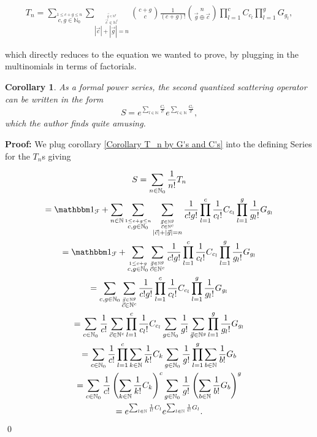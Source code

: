 \documentclass[b5paper,draft,openbib,12pt]{memoir}
\newtheorem{Corollary}[Def]{Corollary}
\newcommand{\id}{{\mathbbm 1}}
\begin{document}
\begin{multline}
T_n = \sum_{\stackrel{1\le c+g\le n}{c,g\in\mathbb{N}_0}}
\sum_{\stackrel{\stackrel{\vec{g}\in\mathbb{N}^g}{\vec{c}\in\mathbb{N}^c}}{|\vec{c}| + |\vec{g}|=n}} 
\binom{c+g}{c} \frac{1}{(c+g)!} \binom{n}{\vec{g}\oplus \vec{c}}
\prod_{l=1}^c  C_{c_l} \prod_{l=1}^g G_{g_l},
\end{multline}

which directly reduces to the equation we wanted to prove, by plugging in the multinomials in terms of
factorials. 

\begin{Corollary}
As a formal power series, the second quantized scattering operator can be written in the form
\begin{equation}\label{Corollary double exp}
S= e^{\sum_{l\in\mathbb{N}} \frac{C_{l}}{l!}}
 e^{\sum_{l\in\mathbb{N}} \frac{G_{l}}{l!}},
\end{equation}
which the author finds quite amusing.
\end{Corollary}
\textbf{Proof:} We plug corollary \ref{Corollary T_n by G's and C's} into the defining Series for the \(T_n\)s
giving

\begin{multline}
S= \sum_{n\in\mathbb{N}_0} \frac{1}{n!} T_n \\
=\id_{\mathcal{F}}+ \sum_{n\in\mathbb{N}} \sum_{\stackrel{1\le c+g\le n}{c,g\in\mathbb{N}_0}} 
\sum_{\stackrel{\stackrel{\vec{g}\in\mathbb{N}^g}{\vec{c}\in\mathbb{N}^c}}{|\vec{c}| + |\vec{g}|=n}} 
\frac{1}{c! g!} \prod_{l=1}^c \frac{1}{c_l!} C_{c_l} \prod_{l=1}^g \frac{1}{g_l!} G_{g_l}\\
=\id_{\mathcal{F}}+  \sum_{\stackrel{1\le c+g }{c,g\in\mathbb{N}_0}} 
\sum_{\stackrel{\vec{g}\in\mathbb{N}^g}{\vec{c}\in\mathbb{N}^c}} 
\frac{1}{c! g!} \prod_{l=1}^c \frac{1}{c_l!} C_{c_l} \prod_{l=1}^g \frac{1}{g_l!} G_{g_l}\\
=\sum_{c,g\in\mathbb{N}_0}
\sum_{\stackrel{\vec{g}\in\mathbb{N}^g}{\vec{c}\in\mathbb{N}^c}} 
\frac{1}{c! g!} \prod_{l=1}^c \frac{1}{c_l!} C_{c_l} \prod_{l=1}^g \frac{1}{g_l!} G_{g_l}\\
=\sum_{c\in\mathbb{N}_0} \frac{1}{c!} \sum_{\vec{c}\in\mathbb{N}^c} \prod_{l=1}^c \frac{1}{c_l!} C_{c_l}
\sum_{g\in\mathbb{N}_0} \frac{1}{g!} \sum_{\vec{g}\in\mathbb{N}^g} \prod_{l=1}^g \frac{1}{g_l!} G_{g_l}\\
=\sum_{c\in\mathbb{N}_0} \frac{1}{c!} \prod_{l=1}^c \sum_{k\in\mathbb{N}} \frac{1}{k!} C_{k}
\sum_{g\in\mathbb{N}_0} \frac{1}{g!}  \prod_{l=1}^g \sum_{b\in\mathbb{N}} \frac{1}{b!} G_{b}\\
=\sum_{c\in\mathbb{N}_0} \frac{1}{c!} \left( \sum_{k\in\mathbb{N}} \frac{1}{k!} C_{k}\right)^c
\sum_{g\in\mathbb{N}_0} \frac{1}{g!}  \left( \sum_{b\in\mathbb{N}} \frac{1}{b!} G_{b}\right)^g\\
=e^{\sum_{l\in\mathbb{N}} \frac{1}{l!} C_{l}} e^{\sum_{l\in\mathbb{N}} \frac{1}{l!} G_{l}}.
\end{multline}
\qed
\end{document}
